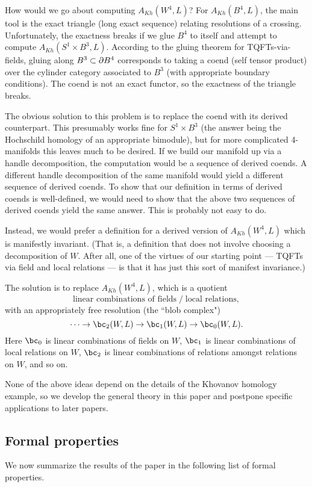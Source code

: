 How would we go about computing $A_{Kh}(W^4, L)$?
For $A_{Kh}(B^4, L)$, the main tool is the exact triangle (long exact sequence)
relating resolutions of a crossing.
Unfortunately, the exactness breaks if we glue $B^4$ to itself and attempt
to compute $A_{Kh}(S^1\times B^3, L)$.
According to the gluing theorem for TQFTs-via-fields, gluing along $B^3 \subset \partial B^4$
corresponds to taking a coend (self tensor product) over the cylinder category
associated to $B^3$ (with appropriate boundary conditions).
The coend is not an exact functor, so the exactness of the triangle breaks.


The obvious solution to this problem is to replace the coend with its derived counterpart.
This presumably works fine for $S^1\times B^3$ (the answer being the Hochschild homology
of an appropriate bimodule), but for more complicated 4-manifolds this leaves much to be desired.
If we build our manifold up via a handle decomposition, the computation
would be a sequence of derived coends.
A different handle decomposition of the same manifold would yield a different
sequence of derived coends.
To show that our definition in terms of derived coends is well-defined, we
would need to show that the above two sequences of derived coends yield the same answer.
This is probably not easy to do.

Instead, we would prefer a definition for a derived version of $A_{Kh}(W^4, L)$
which is manifestly invariant.
(That is, a definition that does not
involve choosing a decomposition of $W$.
After all, one of the virtues of our starting point --- TQFTs via field and local relations ---
is that it has just this sort of manifest invariance.)

The solution is to replace $A_{Kh}(W^4, L)$, which is a quotient
\[
 \text{linear combinations of fields} \;\big/\; \text{local relations} ,
\]
with an appropriately free resolution (the ``blob complex")
\[
	\cdots\to \bc_2(W, L) \to \bc_1(W, L) \to \bc_0(W, L) .
\]
Here $\bc_0$ is linear combinations of fields on $W$,
$\bc_1$ is linear combinations of local relations on $W$,
$\bc_2$ is linear combinations of relations amongst relations on $W$,
and so on.

None of the above ideas depend on the details of the Khovanov homology example,
so we develop the general theory in this paper and postpone specific applications
to later papers.



\subsection{Formal properties}
\label{sec:properties}
We now summarize the results of the paper in the following list of formal properties.

